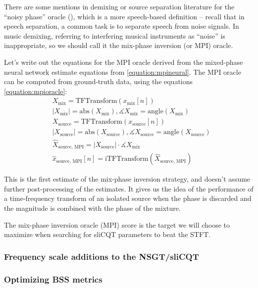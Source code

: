 \documentclass[report.tex]{subfiles}
\begin{document}
There are some mentions in demixing or source separation literature for the ``noisy phase'' oracle (\cite{noisyphase1, noisyphase2}), which is a more speech-based definition -- recall that in speech separation, a common task is to separate speech from noise signals. In music demixing, referring to interfering musical instruments as ``noise'' is inappropriate, so we should call it the mix-phase inversion (or MPI) oracle.

Let's write out the equations for the MPI oracle derived from the mixed-phase neural network estimate equations from \ref{equation:mpineural}. The MPI oracle can be computed from ground-truth data, using the equations \ref{equation:mpioracle}:
\begin{align}\tag{4}\label{equation:mpioracle}
	\nonumber & X_{\text{mix}} = \text{TFTransform}(x_{\text{mix}}[n])\\
	\nonumber & |X_{\text{mix}}| = \text{abs}(X_{\text{mix}}), \measuredangle{X_{\text{mix}}} = \text{angle}(X_{\text{mix}})\\
	\nonumber & X_{\text{source}} = \text{TFTransform}(x_{\text{source}}[n])\\
	\nonumber & |X_{\text{source}}| = \text{abs}(X_{\text{source}}), \measuredangle{X_{\text{source}}} = \text{angle}(X_{\text{source}})\\
	\nonumber & \hat{X}_{\text{source, MPI}} = |X_{\text{source}}| \cdot \measuredangle{X_{\text{mix}}}\\
	\nonumber & \hat{x}_{\text{source, MPI}}[n] = \text{iTFTransform}(\hat{X}_{\text{source, MPI}})
\end{align}

This is the first estimate of the mix-phase inversion strategy, and doesn't assume further post-processing of the estimates. It gives us the idea of the performance of a time-frequency transform of an isolated source when the phase is discarded and the magnitude is combined with the phase of the mixture.

The mix-phase inversion oracle (MPI) score is the target we will choose to maximize when searching for sliCQT parameters to beat the STFT.

\subsubsection{Frequency scale additions to the NSGT/sliCQT}

\subsubsection{Optimizing BSS metrics}
\end{document}
